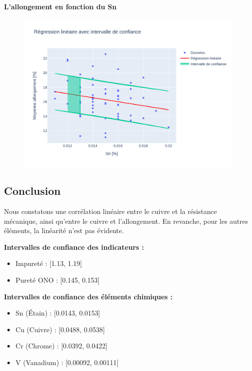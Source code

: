 \documentclass[12pt]{article}
\begin{document}
\textbf{L'allongement en fonction du Sn}
\begin{figure}[H]
\includegraphics[width=\textwidth]{Images/Statistique/Regression_Sn_Allongement.pdf} 
\end{figure}





\subsection{Conclusion}



Nous constatons une corrélation linéaire entre le cuivre et la résistance mécanique, ainsi qu'entre le cuivre et l'allongement. En revanche, pour les autres éléments, la linéarité n'est pas  évidente.



\textbf{Intervalles de confiance des indicateurs :}
\begin{itemize}
\item Impureté : [1.13, 1.19]
\item Pureté ONO : [0.145, 0.153]
\end{itemize}

\textbf{Intervalles de confiance des éléments chimiques :}
\begin{itemize}
\item Sn (Étain) : [0.0143, 0.0153]
\item Cu (Cuivre) : [0.0488, 0.0538]
\item Cr (Chrome) : [0.0392, 0.0422]
\item V (Vanadium) : [0.00092, 0.00111]
\end{itemize}
\end{document}
